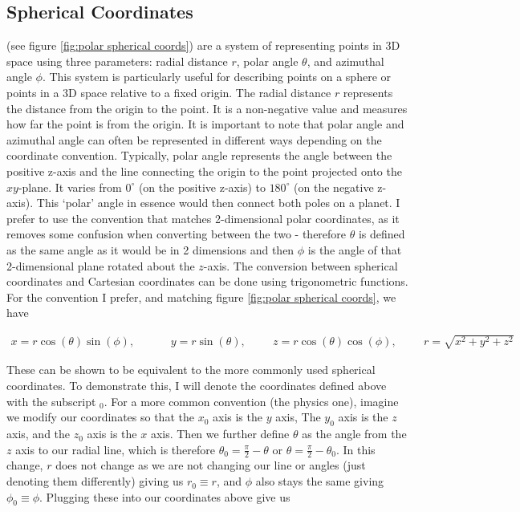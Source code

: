 \subsection{Spherical Coordinates}

 (see figure \ref{fig:polar spherical coords}) are a system of representing points in 3D space using three parameters: radial distance $r$, polar angle $\theta$, and azimuthal angle $\phi$. This system is particularly useful for describing points on a sphere or points in a 3D space relative to a fixed origin. The radial distance $r$ represents the distance from the origin to the point. It is a non-negative value and measures how far the point is from the origin. It is important to note that polar angle and azimuthal angle can often be represented in different ways depending on the coordinate convention. Typically, polar angle represents the angle between the positive z-axis and the line connecting the origin to the point projected onto the $xy$-plane. It varies from $0^\circ$ (on the positive z-axis) to $180^\circ$ (on the negative z-axis). This `polar' angle in essence would then connect both poles on a planet. I prefer to use the convention that matches 2-dimensional polar coordinates, as it removes some confusion when converting between the two - therefore $\theta$ is defined as the same angle as it would be in 2 dimensions and then $\phi$ is the angle of that 2-dimensional plane rotated about the $z$-axis. The conversion between spherical coordinates and Cartesian coordinates can be done using trigonometric functions. For the convention I prefer, and matching figure \ref{fig:polar spherical coords}, we have

\begin{align}
	x = r\cos(\theta)\sin(\phi), &\hspace{1cm} y = r\sin(\theta), \hspace{1cm} z = r\cos(\theta)\cos(\phi), \hspace{1cm}
	r = \sqrt{x^2 + y^2 + z^2}
\end{align}

These can be shown to be equivalent to the more commonly used spherical coordinates. To demonstrate this, I will denote the coordinates defined above with the subscript $_0$. For a more common convention (the physics one), imagine we modify our coordinates so that the $x_0$ axis is the $y$ axis, The $y_0$ axis is the $z$ axis, and the $z_0$ axis is the $x$ axis. Then we further define $\theta$ as the angle from the $z$ axis to our radial line, which is therefore $\theta_0 = \frac{\pi}{2}-\theta$ or  $\theta = \frac{\pi}{2}-\theta_0$. In this change, $r$ does not change as we are not changing our line or angles (just denoting them differently) giving us $r_0\equiv r$, and $\phi$ also stays the same giving $\phi_0 \equiv \phi$. Plugging these into our coordinates above give us

